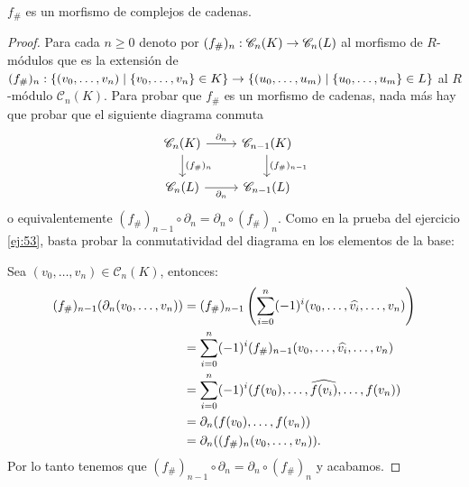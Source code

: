 \begin{ejercicio}\label{ej:59}
  $f_{\#}$ es un morfismo de complejos de cadenas.
\end{ejercicio}
\begin{proof}%
  Para cada $n\geq0$ denoto por $(f_{\#})_n:\mathscr{C}_n(K)\rightarrow\mathscr{C}_n(L)$ al morfismo de $R$-m\'odulos
  que es la extensi\'on de
  $(f_{\#})_n:\{(v_0,\ldots,v_n)\mid\{v_0,\ldots,v_n\}\in K\}\rightarrow\{(u_0,\ldots,u_m)\mid\{u_0,\ldots,u_m\}\in L\}$
  al $R$-m\'odulo $\mathscr{C}_n(K)$. Para probar que $f_{\#}$ es un morfismo de cadenas, nada m\'as hay que
  probar que el siguiente diagrama conmuta
  \[
    \begin{tikzcd}
      \mathscr{C}_n(K) \arrow[r,"\partial_n"] \arrow[d,"(f_{\#})_n"] & \mathscr{C}_{n-1}(K) \arrow[d,"(f_{\#})_{n-1}"] \\
      \mathscr{C}_n(L) \arrow[r,"\partial_n"'] & \mathscr{C}_{n-1}(L)
    \end{tikzcd}
  \]
  o equivalentemente $(f_{\#})_{n-1}\circ\partial_n = \partial_n \circ (f_{\#})_n$.
  Como en la prueba del ejercicio \ref{ej:53}, basta probar la conmutatividad del diagrama en los elementos
  de la base:

  Sea $(v_0,\ldots,v_n)\in\mathscr{C}_n(K)$, entonces:
  \begin{align*}
    (f_{\#})_{n-1}(\partial_n(v_0,\ldots,v_n))& =
    (f_{\#})_{n-1}\left( \sum_{i=0}^n(-1)^i(v_0,\ldots,\widehat{ v_i },\ldots,v_n) \right)\\ &=
    \sum_{i=0}^n (-1)^i (f_{\#})_{n-1}(v_0,\ldots,\widehat{ v_i },\ldots,v_n)\\ &=
    \sum_{i=0}^n (-1)^i (f(v_0),\ldots,\widehat{ f(v_i) },\ldots,f(v_n))\\ &=
    \partial_n(f(v_0),\ldots,f(v_n))\\ &=
    \partial_n((f_{\#})_n(v_0,\ldots,v_n)).
  \end{align*}
  Por lo tanto tenemos que $(f_{\#})_{n-1}\circ\partial_n = \partial_n \circ (f_{\#})_n$ y acabamos.
\end{proof}%

